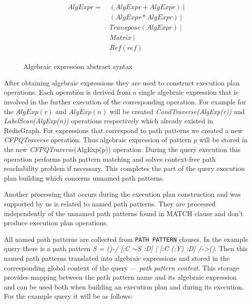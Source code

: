 
\begin{figure}[H]
\caption{Algebraic expression abstract syntax}
\label{fig:alg-expr}
\begin{align*}
\begin{split}
AlgExpr= ~ &(AlgExpr + AlgExpr)~| \\
           &(AlgExpr * AlgExpr)~| \\
           &Transpose(AlgExpr)~| \\
           &Matrix~| \\
           &Ref(ref)        
\end{split}
\end{align*}
\end{figure}

After obtaining algebraic expressions they are used to construct execution plan operations. Each operation is derived from a single algebraic expression that is involved in the further execution of the corresponding operation. For example for the $AlgExp(r)$ and $AlgExp(n)$ will be created \textit{CondTraverse(AlgExp(r))} and \textit{LabelScan(AlgExp(n))} operations respectively which already existed in RedisGraph. For expressions that correspond to path patterns we created a new \textit{CFPQTraverse} operation. Thus algebraic expression of pattern $p$ will be stored in the new \textit{CFPQTraverse}(AlgExp(p)) operation. During the query execution this operation performs path pattern matching and solves context-free path reachability problem if necessary. This completes the part of the query execution plan building which concerns unnamed path patterns.

Another processing that occurs during the execution plan construction and was supported by us is related to named path patterns. They are processed independently of the unnamed path patterns found in MATCH clause and don't produce execution plan operations. 

All named path patterns are collected from \lstinline{PATH PATTERN} clauses. In the example query there is a path pattern \textit{S = ()-/ [:C $\sim$S :D] | [:C (:Y) :D] /->()}. Then this named path patterns translated into algebraic expressions and stored in the corresponding global context of the query --- \textit{path pattern context}. This storage provides mapping between the path pattern name and its algebraic expression and can be used both when building an execution plan and during its execution. For the example query it will be as follows:

